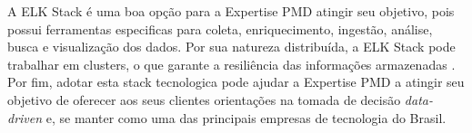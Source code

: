 
A ELK Stack é uma boa opção para a Expertise PMD atingir seu objetivo, pois possui ferramentas especificas para coleta, enriquecimento, ingestão, análise, busca e visualização dos dados. Por sua natureza distribuída, a ELK Stack pode trabalhar em clusters, o que garante a resiliência das informações armazenadas \cite{kononenko2014mining}. Por fim, adotar esta stack tecnologica pode ajudar a Expertise PMD a atingir seu objetivo de oferecer aos seus clientes orientações na tomada de decisão \textit{data-driven} e, se manter como uma das principais empresas de tecnologia do Brasil.